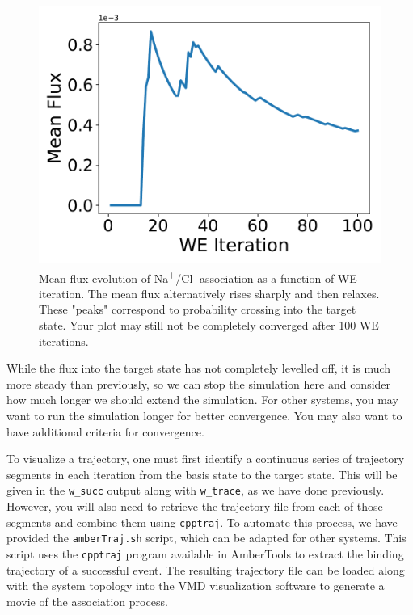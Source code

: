 \documentclass[9pt,tutorial,pubversion]{livecoms}
\begin{document}
\begin{figure}
\includegraphics[width=\linewidth]{Figure5.pdf}
\caption{Mean flux evolution of Na\textsuperscript{+}/Cl\textsuperscript{-} association as a function of WE iteration. 
The mean flux alternatively rises sharply and then relaxes. 
These "peaks" correspond to probability crossing into the target state. 
Your plot may still not be completely converged after 100 WE iterations.}
\label{fig:view}
\end{figure}

While the flux into the target state has not completely levelled off, it is much more steady than previously, so we can stop the simulation here and consider how much longer we should extend the simulation. 
For other systems, you may want to run the simulation longer for better convergence. 
You may also want to have additional criteria for convergence.

To visualize a trajectory, one must first identify a continuous series of trajectory segments in each iteration from the basis state to the target state. 
This will be given in the \verb|w_succ| output along with \verb|w_trace|, as we have done previously. 
However, you will also need to retrieve the trajectory file from each of those segments and combine them using \verb|cpptraj|. 
To automate this process, we have provided the \verb|amberTraj.sh| script, which can be adapted for other systems. 
This script uses the \verb|cpptraj| program available in AmberTools to extract the binding trajectory of a successful event.
The resulting trajectory file can be loaded along with the system topology into the VMD visualization software to generate a movie of the association process.
 
\end{document}
